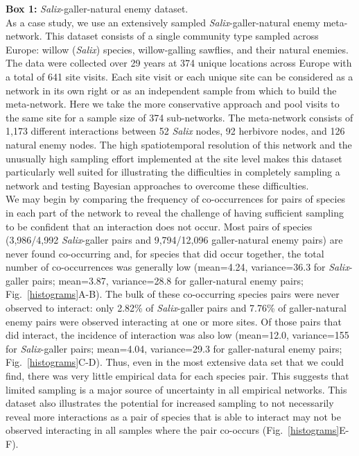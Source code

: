 \documentclass[12pt]{article}
\begin{document}
\begin{fullbox}{}
  \begin{spacing}{1.0}
    \textbf{Box 1: }\emph{Salix}-galler-natural enemy dataset.\\
    \indent As a case study, we use an extensively sampled \emph{Salix}-galler-natural enemy meta-network. This dataset consists of a single community type sampled across Europe: willow (\emph{Salix}) species, willow-galling sawflies, and their natural enemies. The data were collected over 29 years at 374 unique locations across Europe with a total of 641 site visits. Each site visit or each unique site can be considered as a network in its own right or as an independent sample from which to build the meta-network. Here we take the more conservative approach and pool visits to the same site for a sample size of 374 sub-networks. The meta-network consists of 1,173 different interactions between 52 \emph{Salix} nodes, 92 herbivore nodes, and 126 natural enemy nodes. The high spatiotemporal resolution of this network and the unusually high sampling effort implemented at the site level makes this dataset particularly well suited for illustrating the difficulties in completely sampling a network and testing Bayesian approaches to overcome these difficulties.\\
    \indent We may begin by comparing the frequency of co-occurrences for pairs of species in each part of the network to reveal the challenge of having sufficient sampling to be confident that an interaction does not occur. Most pairs of species (3,986/4,992 \emph{Salix}-galler pairs and  9,794/12,096 galler-natural enemy pairs) are never found co-occurring and, for species that did occur together, the total number of co-occurrences was generally low (mean=4.24, variance=36.3 for \emph{Salix}-galler pairs; mean=3.87, variance=28.8 for galler-natural enemy pairs; Fig.~\ref{histograms}A-B). The bulk of these co-occurring species pairs were never observed to interact: only 2.82\% of \emph{Salix}-galler pairs and 7.76\% of galler-natural enemy pairs were observed interacting at one or more sites. Of those pairs that did interact, the incidence of interaction was also low (mean=12.0, variance=155 for \emph{Salix}-galler pairs; mean=4.04, variance=29.3 for galler-natural enemy pairs; Fig.~\ref{histograms}C-D). Thus, even in the most extensive data set that we could find, there was very little empirical data for each species pair. This suggests that limited sampling is a major source of uncertainty in all empirical networks. This dataset also illustrates the potential for increased sampling to not necessarily reveal more interactions as a pair of species that is able to interact may not be observed interacting in all samples where the pair co-occurs (Fig.~\ref{histograms}E-F).
  \end{spacing}
\end{fullbox}
\end{document}
